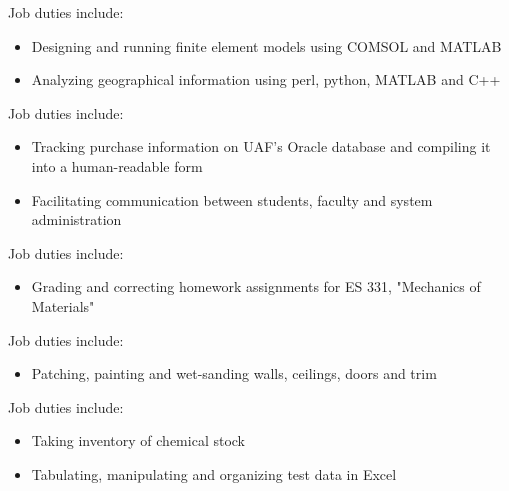 \documentclass{resume}
\begin{document}
    \normalsize
    Job duties include:
    \small
    \begin{itemize}
        \item Designing and running finite element models using COMSOL and MATLAB
        \item Analyzing geographical information using perl, python, MATLAB and C++
    \end{itemize}
    \normalsize
    \medskip
    
    \normalsize
    Job duties include:
    \small
    \begin{itemize}
        \item Tracking purchase information on UAF's Oracle database and compiling it into a human-readable form
        \item Facilitating communication between students, faculty and system administration
    \end{itemize}
    \normalsize
    \medskip
    
    \normalsize
    Job duties include:
    \small
    \begin{itemize}
        \item Grading and correcting homework assignments for ES 331, "Mechanics of Materials"
    \end{itemize}\normalsize
    \medskip
    
    \normalsize
    Job duties include:
    \small\begin{itemize}
        \item Patching, painting and wet-sanding walls, ceilings, doors and trim
    \end{itemize}
    \normalsize
    \medskip
    

    \normalsize
    Job duties include:
    \small
    \begin{itemize}
        \item Taking inventory of chemical stock
        \item Tabulating, manipulating and organizing test data in Excel
    \end{itemize}
    \normalsize
    \medskip
\end{document}
